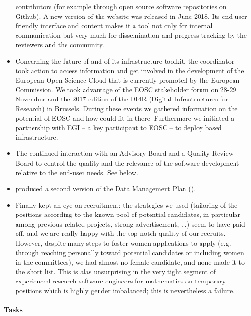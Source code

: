 \begin{itemize}
  contributors (for example through open source software repositories
  on Github). A new version of the website was released in June 2018.
  Its end-user friendly interface and content makes it a tool not only
  for internal communication but very much for dissemination and
  progress tracking by the reviewers and the community.
\item Concerning the future of \ODK and of its infrastructure toolkit,
  the coordinator took action to access information and get involved
  in the development of the European Open Science Cloud that is
  currently promoted by the European Commission. We took advantage of
  the EOSC stakeholder forum on 28-29 November and the 2017 edition of
  the DI4R (Digital Infrastructures for Research) in Brussels. During
  these events we gathered information on the potential of EOSC and
  how \ODK could fit in there. Furthermore we initiated a partnership
  with EGI -- a key participant to EOSC -- to deploy \ODK based
  infrastructure.
\item The continued interaction with an Advisory Board and a Quality
  Review Board to control the quality and the relevance of the
  software development relative to the end-user needs. See below.
\item {} produced a second version of the Data Management Plan
  ().
\item Finally  kept an eye on recruitment: the strategies we
  used (tailoring of the positions according to the known pool of
  potential candidates, in particular among previous related projects,
  strong advertisement, ...) seem to have paid off, and we are really
  happy with the top notch quality of our recruits. However, despite
  many steps to foster women applications to apply (e.g. through
  reaching personally toward potential candidates or including women
  in the committees), we had almost no female candidate, and none made
  it to the short list. This is alas unsurprising in the very tight
  segment of experienced research software engineers for mathematics
  on temporary positions which is highly gender imbalanced; this is
  nevertheless a failure.
\end{itemize}


\paragraph{Tasks}

